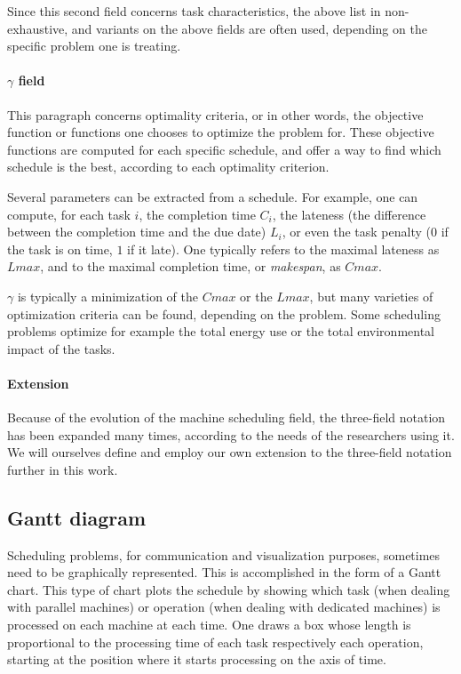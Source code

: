 \documentclass{mimosis}
\begin{document}
Since this second field concerns task characteristics, the above list in non-exhaustive, and variants on the above fields are often used, depending on the specific problem one is treating.

\paragraph{\(\gamma\) field}
This paragraph concerns optimality criteria, or in other words, the objective function or functions one chooses to optimize the problem for. These objective functions are computed for each specific schedule, and offer a way to find which schedule is the best, according to each optimality criterion.

Several parameters can be extracted from a schedule. For example, one can compute, for each task \(i\), the completion time \(C_i\), the lateness (the difference between the completion time and the due date) \(L_i\), or even the task penalty (\(0\) if the task is on time, \(1\) if it late). One typically refers to the maximal lateness as \(Lmax\), and to the maximal completion time, or \emph{makespan}, as \(Cmax\). 

\(\gamma\) is typically a minimization of the \(Cmax\) or the \(Lmax\), but many varieties of optimization criteria can be found, depending on the problem. Some scheduling problems optimize for example the total energy use or the total environmental impact of the tasks.

\paragraph{Extension}

Because of the evolution of the machine scheduling field, the three-field notation has been expanded many times, according to the needs of the researchers using it. We will ourselves define and employ our own extension to the three-field notation further in this work.

\subsection{Gantt diagram} 
Scheduling problems, for communication and visualization purposes, sometimes need to be graphically represented. This is accomplished in the form of a Gantt chart. This type of chart plots the schedule by showing which task (when dealing with parallel machines) or operation (when dealing with dedicated machines) is processed on each machine at each time. One draws a box whose length is proportional to the processing time of each task respectively each operation, starting at the position where it starts processing on the axis of time.
\end{document}
